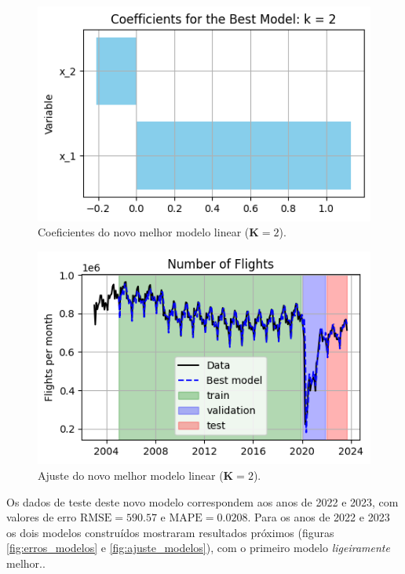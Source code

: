 \documentclass[final,5p]{elsarticle}
\numberwithin{equation}{section}
\begin{document}
        \begin{figure}[hbt!]
            \includegraphics[width=0.95\columnwidth]{C1_CoefficientsNoScaling.png}
            \caption{Coeficientes do novo melhor modelo linear ($\textbf{K} = 2$).}
            \label{fig:coeficientes_novo}
        \end{figure}

        \begin{figure}[hbt!]
            \includegraphics[width=0.95\columnwidth]{C2_BestModelFit.png}
            \caption{Ajuste do novo melhor modelo linear ($\textbf{K} = 2$).}
            \label{fig:ajuste_novo}
        \end{figure}

        Os dados de teste deste novo modelo correspondem aos anos de 2022 e 2023, com valores de erro $\text{RMSE} = 590.57$ e $\text{MAPE} = 0.0208$. Para os anos de 2022 e 2023 os dois modelos construídos mostraram resultados próximos (figuras \ref{fig:erros_modelos} e \ref{fig:ajuste_modelos}), com o primeiro modelo \emph{ligeiramente} melhor..
\end{document}
